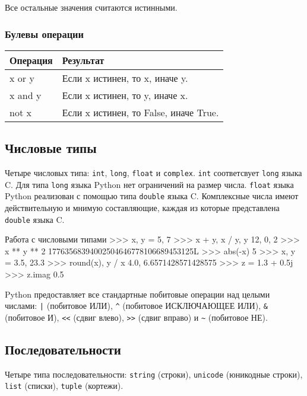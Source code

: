 Все остальные значения считаются истинными.

\subsubsection{Булевы операции}
\begin{center}
  \begin{tabular}{lp{6cm}}
    \toprule
    Операция & Результат \\
    \midrule
    x or y & Если x истинен, то x, иначе y. \\
    x and y & Если x истинен, то y, иначе x. \\
    not x & Если x истинен, то False, иначе True. \\
    \bottomrule
  \end{tabular}
\end{center}

\subsection{Числовые типы}
Четыре числовых типа: \lstinline{int}, \lstinline{long}, \lstinline{float} и \lstinline{complex}. \lstinline{int} соответсвует \lstinline{long} языка C. Для типа \lstinline{long} языка Python нет ограничений на размер числа. \lstinline{float} языка Python реализован с помощью типа \lstinline{double} языка C. Комплексные числа имеют действительную и мнимую составляющие, каждая из которые представлена \lstinline{double} языка C.

\begin{pylst}{Работа с числовыми типами}{}
>>> x, y = 5, 7
>>> x + y, x / y, y %
12, 0, 2
>>> x ** y ** 2
17763568394002504646778106689453125L
>>> abs(-x)
5
>>> x, y = 3.5, 23.3
>>> round(x), y / x
4.0, 6.6571428571428575
>>> z = 1.3 + 0.5j
>>> z.imag
0.5
\end{pylst}

Python предоставляет все стандартные побитовые операции над целыми числами: \lstinline{|} (побитовое ИЛИ), \lstinline{^} (побитовое ИСКЛЮЧАЮЩЕЕ ИЛИ), \lstinline{&} (побитовое И), \lstinline{<<} (сдвиг влево), \lstinline{>>} (сдвиг вправо) и \lstinline{~} (побитовое НЕ).

\subsection{Последовательности}
Четыре типа последовательности: \lstinline{string} (строки), \lstinline{unicode} (юникодные строки), \lstinline{list} (списки), \lstinline{tuple} (кортежи).

